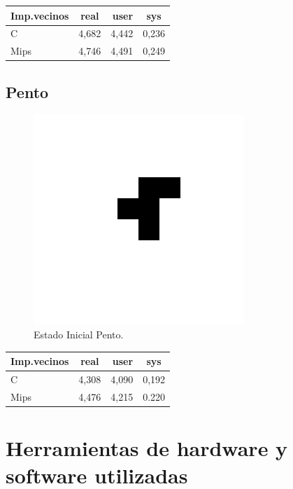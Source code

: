 \documentclass[a4paper,12pt]{article}
\numberwithin{equation}{section}
\numberwithin{figure}{section}
\begin{document}
	\begin{center}
		\begin{tabular}{|l|c|r|c|}
			\hline 
			Imp.vecinos & real & user & sys\\
			\hline 
			C & 4,682 & 4,442 & 0,236\\
			\hline
			Mips & 4,746 & 4,491 & 0,249\\
			\hline
		\end{tabular}
	\end{center}
	
	\subsection{Pento} 
	
	\begin{figure}[!htb]
		\centering
		\includegraphics[scale=0.5]{includes/gl_img/pento001.png}
		\caption{Estado Inicial Pento.}
	\end{figure}
	
	\begin{center}
		\begin{tabular}{|l|c|r|c|}
			\hline 
			Imp.vecinos & real & user & sys\\
			\hline 
			C & 4,308 & 4,090 & 0,192\\
			\hline
			Mips & 4,476 & 4,215 & 0.220\\
			\hline
		\end{tabular}
	\end{center}
	
	\section{Herramientas de hardware y software utilizadas}\label{sec_tools}
	
\end{document}

